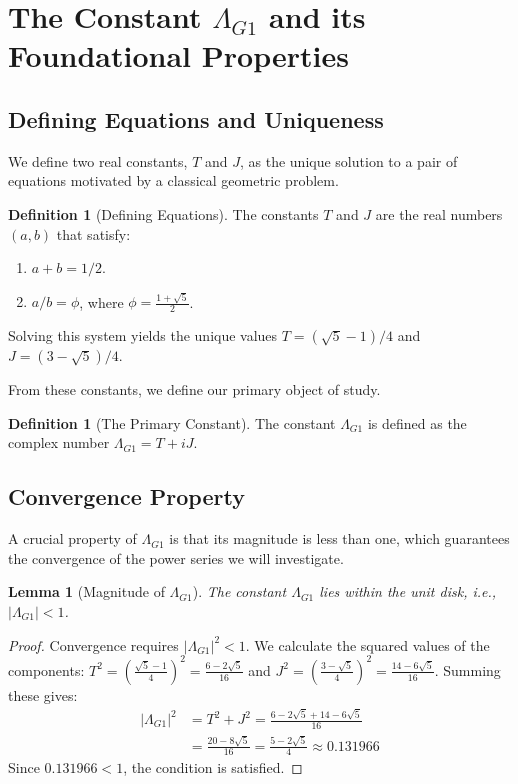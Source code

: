 \documentclass{amsart}
\theoremstyle{plain}
\newtheorem{lemma}[theorem]{Lemma}
\theoremstyle{definition}
\newtheorem{definition}[theorem]{Definition}
\theoremstyle{remark}
\newcommand{\LambdaG}{\Lambda_{G1}}
\begin{document}
\section{The Constant \texorpdfstring{$\Lambda_{G1}$}{Lambda\_G1} and its Foundational Properties}

\subsection{Defining Equations and Uniqueness}
We define two real constants, $T$ and $J$, as the unique solution to a pair of equations motivated by a classical geometric problem.

\begin{definition}[Defining Equations]
The constants $T$ and $J$ are the real numbers $(a,b)$ that satisfy:
\begin{enumerate}
    \item $a+b = 1/2$.
    \item $a/b = \phi$, where $\phi = \frac{1+\sqrt{5}}{2}$.
\end{enumerate}
Solving this system yields the unique values $T = (\sqrt{5}-1)/4$ and $J = (3-\sqrt{5})/4$.
\end{definition}

From these constants, we define our primary object of study.
\begin{definition}[The Primary Constant]
The constant $\LambdaG$ is defined as the complex number $\LambdaG = T+iJ$.
\end{definition}

\subsection{Convergence Property}
A crucial property of $\LambdaG$ is that its magnitude is less than one, which guarantees the convergence of the power series we will investigate.

\begin{lemma}[Magnitude of $\LambdaG$]
\label{lem:convergence}
The constant $\LambdaG$ lies within the unit disk, i.e., $|\LambdaG| < 1$.
\end{lemma}
\begin{proof}
Convergence requires $|\LambdaG|^2 < 1$. We calculate the squared values of the components:
$T^2 = \left(\frac{\sqrt{5}-1}{4}\right)^2 = \frac{6-2\sqrt{5}}{16}$ and $J^2 = \left(\frac{3-\sqrt{5}}{4}\right)^2 = \frac{14-6\sqrt{5}}{16}$.
Summing these gives:
\begin{align*}
    |\LambdaG|^2 &= T^2+J^2 = \frac{6-2\sqrt{5} + 14-6\sqrt{5}}{16} \\
                 &= \frac{20-8\sqrt{5}}{16} = \frac{5-2\sqrt{5}}{4} \approx 0.131966
\end{align*}
Since $0.131966 < 1$, the condition is satisfied.
\end{proof}
\end{document}
